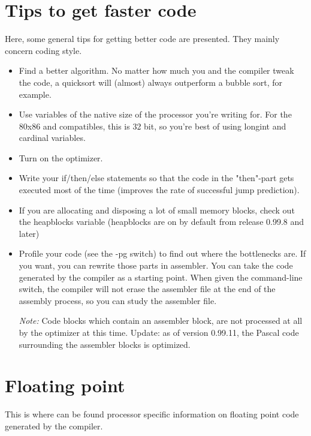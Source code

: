 \section{Tips to get faster code}
Here, some general tips for getting better code are presented. They
mainly concern coding style.

\begin{itemize}
\item Find a better algorithm. No matter how much you and the compiler
tweak the code, a quicksort will (almost) always outperform a bubble
sort, for example.

\item Use variables of the native size of the processor you're writing
for. For the 80x86 and compatibles, this is 32 bit, so you're best of
using longint and cardinal variables.

\item Turn on the optimizer.

\item Write your if/then/else statements so that the code in the "then"-part
gets executed most of the time (improves the rate of successful jump prediction).

\item If you are allocating and disposing a lot of small memory blocks,
check out the heapblocks variable (heapblocks are on by default from
release 0.99.8 and later)

\item Profile your code (see the -pg switch) to find out where the
bottlenecks are. If you want, you can rewrite those parts in assembler.
You can take the code generated by the compiler as a starting point. When
given the  command-line switch, the compiler will not erase the
assembler file at the end of the assembly process, so you can study the
assembler file.

{\em Note:} Code blocks which contain an assembler block, are not processed
at all by the optimizer at this time. Update: as of version 0.99.11,
the Pascal code surrounding the assembler blocks is optimized.
\end{itemize}

\section{Floating point}

This is where can be found processor specific information on floating
point code generated by the compiler.

